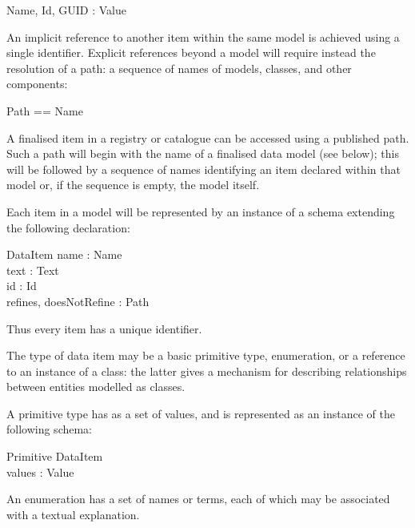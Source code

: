 \documentclass{article}
\begin{document}
		\begin{axdef}
			Name, Id, GUID : \power Value 
		\end{axdef}
		An implicit reference to another item within the same model is achieved using a single identifier.  Explicit references beyond a model will require instead the resolution of a path: a sequence of names of models, classes, and other components:
		\begin{syntax}
			Path == \seq Name 
		\end{syntax}
		A finalised item in a registry or catalogue can be accessed using a published path.  Such a path will begin with the name of a finalised data model (see below); this will be followed by a sequence of names identifying an item declared within that model or, if the sequence is empty, the model itself. 
		
		
		Each item in a model will be represented by an instance of a schema extending the following declaration:
		\begin{schema}{DataItem}
			name : Name \\
			text : Text \\
			id : Id \\
			refines, doesNotRefine : \power Path
		\end{schema}
		Thus every item has a unique identifier.
		
		The type of data item may be a basic primitive type, enumeration, or a reference to an instance of a class: the latter gives a mechanism for describing relationships between entities modelled as classes.
		
		A primitive type has as a set of values, and is represented as an instance of the following schema:
		\begin{schema}{Primitive}
			DataItem \\
			values : \power Value 
		\end{schema}
		An enumeration has a set of names or terms, each of which may be associated with a textual explanation.
		
\end{document}
